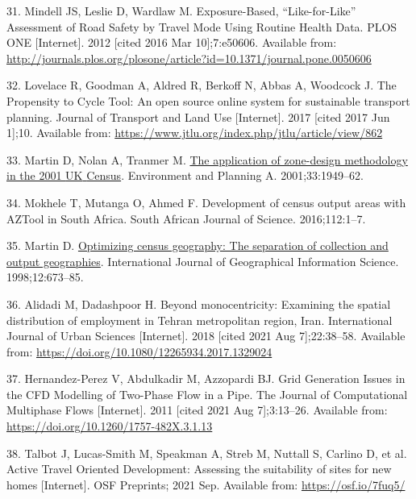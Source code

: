 \documentclass{josis}
\newlength{\cslhangindent}
\newenvironment{CSLReferences}[2] %
 {%
  \setlength{\parindent}{0pt}
  \ifodd #1 \everypar{\setlength{\hangindent}{\cslhangindent}}\ignorespaces\fi
  \ifnum #2 > 0
  \setlength{\parskip}{#2\baselineskip}
  \fi
 }%
 {}
\begin{document}
\begin{CSLReferences}{0}{0}
\leavevmode{}%
31. Mindell JS, Leslie D, Wardlaw M. Exposure-{Based}, {``{Like}-for-{Like}''} {Assessment} of {Road} {Safety} by {Travel} {Mode} {Using} {Routine} {Health} {Data}. PLOS ONE {[}Internet{]}. 2012 {[}cited 2016 Mar 10{]};7:e50606. Available from: \url{http://journals.plos.org/plosone/article?id=10.1371/journal.pone.0050606}

\leavevmode{}%
32. Lovelace R, Goodman A, Aldred R, Berkoff N, Abbas A, Woodcock J. The {Propensity} to {Cycle} {Tool}: {An} open source online system for sustainable transport planning. Journal of Transport and Land Use {[}Internet{]}. 2017 {[}cited 2017 Jun 1{]};10. Available from: \url{https://www.jtlu.org/index.php/jtlu/article/view/862}

\leavevmode{}%
33. Martin D, Nolan A, Tranmer M. \href{https://doi.org/fr8qtc}{The application of zone-design methodology in the 2001 {UK} {Census}}. Environment and Planning A. 2001;33:1949--62.

\leavevmode{}%
34. Mokhele T, Mutanga O, Ahmed F. Development of census output areas with {AZTool} in {South} {Africa}. South African Journal of Science. 2016;112:1--7.

\leavevmode{}%
35. Martin D. \href{https://doi.org/bqqm35}{Optimizing census geography: The separation of collection and output geographies}. International Journal of Geographical Information Science. 1998;12:673--85.

\leavevmode{}%
36. Alidadi M, Dadashpoor H. Beyond monocentricity: Examining the spatial distribution of employment in {Tehran} metropolitan region, {Iran}. International Journal of Urban Sciences {[}Internet{]}. 2018 {[}cited 2021 Aug 7{]};22:38--58. Available from: \url{https://doi.org/10.1080/12265934.2017.1329024}

\leavevmode{}%
37. Hernandez-Perez V, Abdulkadir M, Azzopardi BJ. Grid {Generation} {Issues} in the {CFD} {Modelling} of {Two}-{Phase} {Flow} in a {Pipe}. The Journal of Computational Multiphase Flows {[}Internet{]}. 2011 {[}cited 2021 Aug 7{]};3:13--26. Available from: \url{https://doi.org/10.1260/1757-482X.3.1.13}

\leavevmode{}%
38. Talbot J, Lucas-Smith M, Speakman A, Streb M, Nuttall S, Carlino D, et al. Active {Travel} {Oriented} {Development}: {Assessing} the suitability of sites for new homes {[}Internet{]}. OSF Preprints; 2021 Sep. Available from: \url{https://osf.io/7fuq5/}


\end{CSLReferences}
\end{document}
